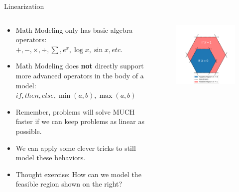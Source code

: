 \documentclass[10pt, aspectratio=169]{beamer}
\begin{document}
\begin{frame}{Linearization}
    \begin{columns}
        \begin{column}{0.5\textwidth}
            \begin{itemize}
                \item Math Modeling only has basic algebra operators: $+,-,\times,\div,\sum,e^x,\log{x},\sin{x},etc.$
                \item Math Modeling does \textbf{not} directly support more advanced operators in the body of a model: $if,then,else,\min(a,b),\max(a,b)$
                \item Remember, problems will solve MUCH faster if we can keep problems as linear as possible.
                \item We can apply some clever tricks to still model these behaviors.
                \item Thought exercise: How can we model the feasible region shown on the right?
            \end{itemize}
        \end{column}
        \begin{column}{0.5\textwidth}
            \begin{figure}
                \includegraphics[width=\linewidth]{BigM.png}

            \end{figure}
        \end{column}
    \end{columns}
\end{frame}
\end{document}
